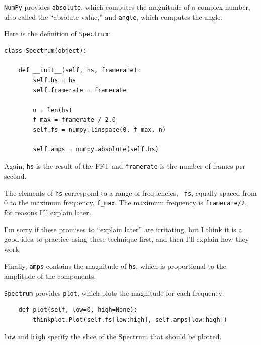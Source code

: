 \documentclass[12pt]{book}
\begin{document}
{\tt NumPy} provides {\tt absolute}, which computes
the magnitude of a complex number, also called the ``absolute value,''
and {\tt angle}, which computes the angle.

Here is the definition of {\tt Spectrum}:

\begin{verbatim}
class Spectrum(object):

    def __init__(self, hs, framerate):
        self.hs = hs
        self.framerate = framerate

        n = len(hs)
        f_max = framerate / 2.0
        self.fs = numpy.linspace(0, f_max, n)

        self.amps = numpy.absolute(self.hs)
\end{verbatim}

Again, {\tt hs} is the result of the FFT and {\tt framerate}
is the number of frames per second.

The elements of {\tt hs} correspond to a range of frequencies, {\tt
  fs}, equally spaced from 0 to the maximum frequency, \verb"f_max".
The maximum frequency is {\tt framerate/2}, for reasons I'll explain
later.

I'm sorry if these promises to ``explain later'' are irritating, but
I think it is a good idea to practice using these technique first, and
then I'll explain how they work.

Finally, {\tt amps} contains the magnitude of {\tt hs}, which
is proportional to the amplitude of the components.

{\tt Spectrum} provides {\tt plot}, which plots the magnitude for each
frequency:

\begin{verbatim}
    def plot(self, low=0, high=None):
        thinkplot.Plot(self.fs[low:high], self.amps[low:high])
\end{verbatim}

{\tt low} and {\tt high} specify the slice of the Spectrum that
should be plotted.


\section{}


\begin{verbatim}
\end{verbatim}


\begin{verbatim}
\end{verbatim}
\end{document}
